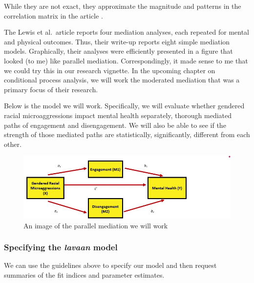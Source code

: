 \documentclass[
  11pt,
]{book}
\begin{document}
While they are not exact, they approximate the magnitude and patterns in the correlation matrix in the article \citep{lewis_applying_2017}.

The Lewis et al.~article \citeyearpar{lewis_applying_2017} reports four mediation analyses, each repeated for mental and physical outcomes. Thus, their write-up reports eight simple mediation models. Graphically, their analyses were efficiently presented in a figure that looked (to me) like parallel mediation. Correspondingly, it made sense to me that we could try this in our research vignette. In the upcoming chapter on conditional process analysis, we will work the moderated mediation that was a primary focus of their research.

Below is the model we will work. Specifically, we will evaluate whether gendered racial microaggressions impact mental health separately, thorough mediated paths of engagement and disengagement. We will also be able to see if the strength of those mediated paths are statistically, significantly, different from each other.

\begin{figure}
\centering
\includegraphics{images/CompMed/LewisParaMed.jpg}
\caption{An image of the parallel mediation we will work}
\end{figure}

\hypertarget{specifying-the-lavaan-model}{%
\subsubsection{\texorpdfstring{Specifying the \emph{lavaan} model}{Specifying the lavaan model}}\label{specifying-the-lavaan-model}}

We can use the guidelines above to specify our model and then request summaries of the fit indices and parameter estimates.
\end{document}
